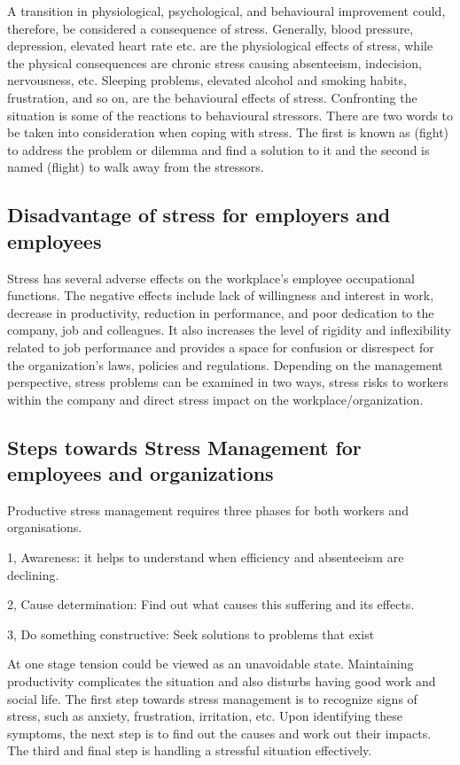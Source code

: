 A transition in physiological, psychological, and behavioural improvement could, therefore, be considered a consequence of stress.  Generally, blood pressure, depression, elevated heart rate etc. are the physiological effects of stress, while the physical consequences are chronic stress causing absenteeism, indecision, nervousness, etc. Sleeping problems, elevated alcohol and smoking habits, frustration, and so on, are the behavioural effects of stress. Confronting the situation is some of the reactions to behavioural stressors. There are two words to be taken into consideration when coping with stress. The first is known as (fight) to address the problem or dilemma and find a solution to it and the second is named (flight) to walk away from the stressors. \citep[p.348]{Parker2008PersonalityProcess}
\subsection{Disadvantage of stress for employers and employees}
Stress has several adverse effects on the workplace's employee occupational functions. The negative effects include lack of willingness and interest in work, decrease in productivity, reduction in performance, and poor dedication to the company, job and colleagues.  It also increases the level of rigidity and inflexibility related to job performance and provides a space for confusion or disrespect for the organization's laws, policies and regulations. \citep[p.10]{Fairbrother2003WorkplaceSatisfaction} Depending on the management perspective, stress problems can be examined in two ways, stress risks to workers within the company and direct stress impact on the workplace/organization. 

\subsection{Steps towards Stress Management for employees and organizations}
Productive stress management requires three phases for both workers and organisations. 

1, Awareness: it helps to understand when efficiency and absenteeism are declining.

2, Cause determination: Find out what causes this suffering and its effects.

3, Do something constructive: Seek solutions to problems that exist

At one stage tension could be viewed as an unavoidable state. Maintaining productivity complicates the situation and also disturbs having good work and social life. The first step towards stress management is to recognize signs of stress, such as anxiety, frustration, irritation, etc. Upon identifying these symptoms, the next step is to find out the causes and work out their impacts. The third and final step is handling a stressful situation effectively.

